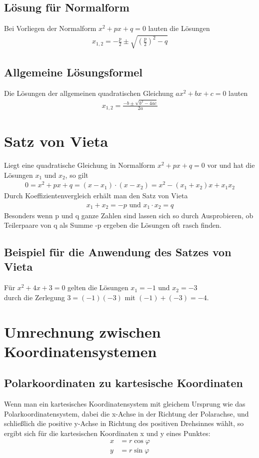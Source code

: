 \documentclass[a4paper]{article}
\begin{document}
\subsection{Lösung für Normalform}
Bei Vorliegen der Normalform $x^2+px+q=0$ lauten die Lösungen
\begin{align*}
x_{1,2} = - \frac{p}{2}\pm\sqrt{\left(\frac{p}2\right)^{2} - q}
\end{align*}
\subsection{Allgemeine Lösungsformel}
Die Lösungen der allgemeinen quadratischen Gleichung $ax^{2}+bx+c=0$ lauten
\begin{align*}
x_{1,2} = \frac{-b\pm\sqrt{b^2-4ac}}{2a} 
\end{align*}
\section{Satz von Vieta}
Liegt eine quadratische Gleichung in Normalform $x^2+px+q=0$ vor und hat die Lösungen $x_{1}$ und $x_{2}$, so gilt
\begin{align*}
0=x^{2}+px+q=( x -x_{1} ) \cdot ( x - x_{2} ) = x^{2} - (x_{1} + x_{2}) x + x_{1} x_{2}
\end{align*}
Durch Koeffizientenvergleich erhält man den Satz von Vieta
\begin{align*}
x_{1} + x_{2} = -p \text{ und } x_{1} \cdot x_{2} = q
\end{align*}
Besonders wenn p und q ganze Zahlen sind lassen sich so durch Ausprobieren, ob Teilerpaare von q als Summe -p ergeben die Lösungen oft rasch finden.
\subsection{Beispiel für die Anwendung des Satzes von Vieta}
Für $x^2 + 4x + 3 = 0$ gelten die Lösungen $x_{1} = -1$ und $x_{2} = -3$ \\ durch die Zerlegung $3 = (-1)(-3)$ mit $(-1) + (-3) = -4$.

\section{Umrechnung zwischen Koordinatensystemen}
\subsection{Polarkoordinaten zu kartesische Koordinaten}
Wenn man ein kartesisches Koordinatensystem mit gleichem Ursprung wie das Polarkoordinatensystem, dabei die x-Achse in der Richtung der Polarachse, und schließlich die positive y-Achse in Richtung des positiven Drehsinnes wählt, so ergibt sich für die kartesischen Koordinaten x und y eines Punktes:
\begin{align*}
x &= r\cos \varphi \\
y &= r\sin \varphi
\end{align*}
\end{document}
